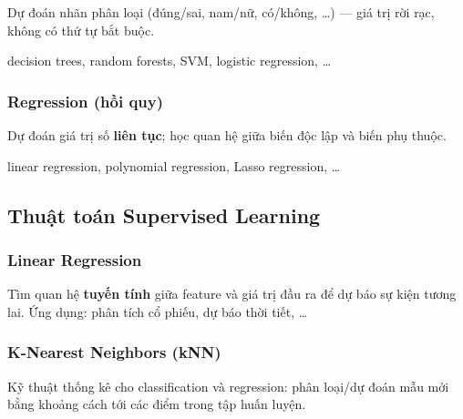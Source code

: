 \begin{ynghia}[title={target}]
Dự đoán nhãn phân loại (đúng/sai, nam/nữ, có/không, \ldots) --- giá trị rời rạc, không có thứ tự bắt buộc.
\end{ynghia}

\begin{phuongphap}[title={Thuật toán phổ biến}]
decision trees, random forests, SVM, logistic regression, \ldots
\end{phuongphap}

\subsubsection{Regression (hồi quy)}

\begin{ynghia}[title={target}]
Dự đoán giá trị số \textbf{liên tục}; học quan hệ giữa biến độc lập và biến phụ thuộc.
\end{ynghia}

\begin{phuongphap}[title={Thuật toán phổ biến}]
linear regression, polynomial regression, Lasso regression, \ldots
\end{phuongphap}

\subsection{Thuật toán Supervised Learning}

\subsubsection{Linear Regression}

\begin{ynghia}[title={Hồi quy tuyến tính}]
Tìm quan hệ \textbf{tuyến tính} giữa feature và giá trị đầu ra để dự báo sự kiện tương lai.
Ứng dụng: phân tích cổ phiếu, dự báo thời tiết, \ldots
\end{ynghia}

\subsubsection{K-Nearest Neighbors (kNN)}

\begin{ynghia}[title={kNN}]
Kỹ thuật thống kê cho classification và regression: phân loại/dự đoán mẫu mới bằng khoảng cách tới các điểm trong tập huấn luyện.
\end{ynghia}


